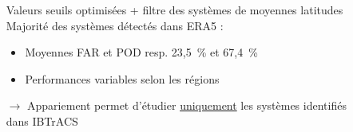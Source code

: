 \documentclass[aspectratio=169, usepdftitle=false, xcolor={dvipsnames}, 9pt,table]{beamer}
\begin{document}
\begin{frame}[t]
\begin{columns}
\begin{column}{0.56\textwidth}
\begin{figure}
         \end{figure}
         \end{column}
         \begin{column}{0.36\linewidth}
         \scriptsize
         \vspace{-1em}
         \begin{block}        
             Valeurs seuils optimisées + filtre des systèmes de moyennes latitudes \parencite{hart_cyclone_2003}
             \tcblower
             \setlength{\leftmargini}{2.5ex}
             \alert{Majorité} des systèmes détectés dans ERA5 :
             \begin{itemize}
                 \item Moyennes FAR et POD resp. 23,5~\% et 67,4~\%
                 \item Performances variables selon les régions
             \end{itemize}
             $\longrightarrow$ Appariement permet d'étudier \underline{uniquement} les \alert{\mbox{systèmes} identifiés} dans IBTrACS
         \end{block}
         \end{column}
     \end{columns}
 \end{frame}
 
 
\end{document}

